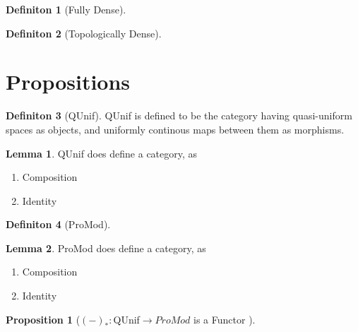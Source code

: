 \documentclass[18pt,a4paper]{article}
\theoremstyle{definition}
\newtheorem{definition}{Definiton}[section]
\newtheorem{lemma}{Lemma}[definition]
\newtheorem{proop}{Proposition}[section]
\begin{document}
\begin{definition}[Fully Dense] %

\end{definition}
\begin{definition}[Topologically Dense] %

\end{definition}
\section{Propositions}
\begin{definition}[QUnif] %
QUnif is defined to be the category having quasi-uniform spaces as objects, and uniformly continous
maps between them as morphisms.
\end{definition}
\begin{lemma} QUnif does define a category, as
	\begin{enumerate}[label=\roman*]
		\item Composition
		\item Identity
	\end{enumerate}
\end{lemma}

\begin{definition}[ProMod] %

\end{definition}

\begin{lemma} ProMod does define a category, as
	\begin{enumerate}[label=\roman*]
		\item Composition
		\item Identity
	\end{enumerate}
\end{lemma}



\begin{proop}[$(-)_*:$QUnif$\to ProMod$ is a Functor ]

\end{proop}
\end{document}
